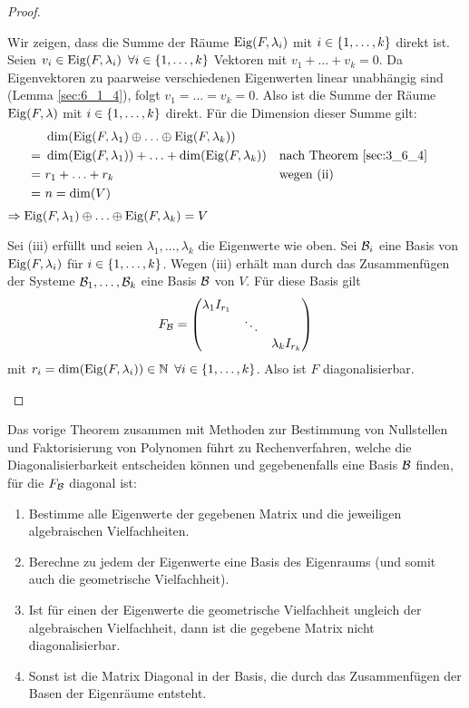 \begin{proof}
\begin{description}[font=\normalfont]
			Wir zeigen, dass die Summe der Räume $ \operatorname{Eig}(F,\lambda_i) $ mit $ i \in \{ 1,\ldots,k \} $ direkt ist. Seien $ v_i \in \operatorname{Eig}(F,\lambda_i) \enspace \forall i \in \{ 1,\ldots,k \} $ Vektoren mit $ v_1 + \ldots + v_k = 0 $. Da Eigenvektoren zu paarweise verschiedenen Eigenwerten linear unabhängig sind (Lemma \ref{sec:6_1_4}), folgt $ v_1 = \ldots = v_k = 0 $. Also ist die Summe der Räume $ \operatorname{Eig}(F,\lambda) $ mit $ i \in \{ 1,\ldots,k \} $ direkt. Für die Dimension dieser Summe gilt:
			\begin{align*}
				&\ \dim(\operatorname{Eig}(F,\lambda_1) \oplus \ldots \oplus \operatorname{Eig}(F,\lambda_k)) \\
				=&\ \dim(\operatorname{Eig}(F,\lambda_1)) + \ldots + \dim(\operatorname{Eig}(F,\lambda_k)) && \text{nach Theorem \ref{sec:3_6_4}} \\
				=&\ r_1 + \ldots + r_k && \text{wegen (ii)} \\
				=&\ n = \dim(V)
			\end{align*} %
			$ \Rightarrow \operatorname{Eig}(F,\lambda_1) \oplus \ldots \oplus \operatorname{Eig}(F,\lambda_k) = V $
		\item[(iii)$ \Rightarrow $(i):]
			Sei (iii) erfüllt und seien $ \lambda_1, \ldots, \lambda_k $ die Eigenwerte wie oben. Sei $ \mathcal{B}_i $ eine Basis von $ \operatorname{Eig}(F,\lambda_i) $ für $ i \in \{ 1,\ldots,k \} $. Wegen (iii) erhält man durch das Zusammenfügen der Systeme $ \mathcal{B}_1, \ldots, \mathcal{B}_k $ eine Basis $ \mathcal{B} $ von $ V $. Für diese Basis gilt
			\begin{equation*}
				F_{\mathcal{B}} = \begin{pmatrix}
					\lambda_1 I_{r_1} && \\
					& \ddots & \\
					&& \lambda_k I_{r_k}
				\end{pmatrix}
			\end{equation*}
			mit $ r_i = \dim(\operatorname{Eig}(F,\lambda_i)) \in \mathbb N \enspace \forall i \in \{ 1,\ldots,k \} $. Also ist $ F $ diagonalisierbar. \qedhere
	\end{description}
\end{proof}
\begin{bem}
	Das vorige Theorem zusammen mit Methoden zur Bestimmung von Nullstellen und Faktorisierung von Polynomen führt zu Rechenverfahren, welche die Diagonalisierbarkeit entscheiden können und gegebenenfalls eine Basis $ \mathcal{B} $ finden, für die $ F_{\mathcal{B}} $ diagonal ist:
	\begin{enumerate}[label=\arabic*.]
		\item Bestimme alle Eigenwerte der gegebenen Matrix und die jeweiligen algebraischen Vielfachheiten. 
		\item Berechne  zu jedem der Eigenwerte  eine Basis des Eigenraums (und somit auch die geometrische Vielfachheit). 
		\item Ist für einen der Eigenwerte die geometrische Vielfachheit ungleich der algebraischen Vielfachheit, dann ist die gegebene Matrix nicht diagonalisierbar. 
		\item Sonst ist die Matrix Diagonal in der Basis, die durch das Zusammenfügen der Basen der Eigenräume entsteht. 
	\end{enumerate} 
\end{bem}


